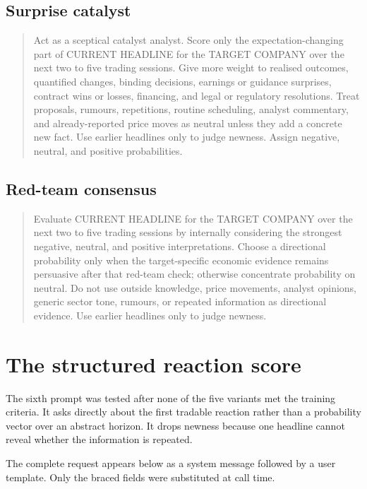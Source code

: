 \subsection*{Surprise catalyst}

\begin{quote}\small
Act as a sceptical catalyst analyst. Score only the expectation-changing part of
CURRENT HEADLINE for the TARGET COMPANY over the next two to five trading
sessions. Give more weight to realised outcomes, quantified changes, binding
decisions, earnings or guidance surprises, contract wins or losses, financing,
and legal or regulatory resolutions. Treat proposals, rumours, repetitions,
routine scheduling, analyst commentary, and already-reported price moves as
neutral unless they add a concrete new fact. Use earlier headlines only to judge
newness. Assign negative, neutral, and positive probabilities.
\end{quote}

\subsection*{Red-team consensus}

\begin{quote}\small
Evaluate CURRENT HEADLINE for the TARGET COMPANY over the next two to five
trading sessions by internally considering the strongest negative, neutral, and
positive interpretations. Choose a directional probability only when the
target-specific economic evidence remains persuasive after that red-team check;
otherwise concentrate probability on neutral. Do not use outside knowledge, price
movements, analyst opinions, generic sector tone, rumours, or repeated
information as directional evidence. Use earlier headlines only to judge newness.
\end{quote}

\section{The structured reaction score}
\label{sec:structured-prompt}

The sixth prompt was tested after none of the five variants met the training
criteria. It asks directly about the first tradable reaction rather than a
probability vector over an abstract horizon. It drops newness because one
headline cannot reveal whether the information is repeated.

The complete request appears below as a system message followed by a user
template. Only the braced fields were substituted at call time.

